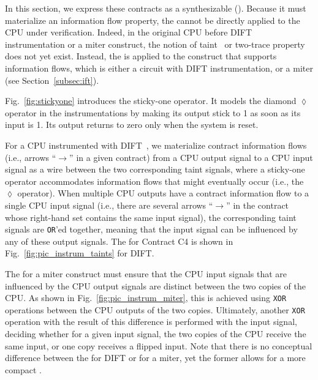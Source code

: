 
In this section, we express these contracts as a synthesizable \pici (\PICI).
Because it must materialize an information flow property, the \PICI cannot be directly applied to the CPU under verification.
Indeed, in the original CPU before DIFT instrumentation or a miter construct, the notion of taint~\cite{solt2022cellift,ceesay2024mucfi} or two-trace property~\cite{wang2023specification,dinesh2024conjunct,dinesh2025h,tan2025contractshadowlogic} does not yet exist.
Instead, the \PICI is applied to the construct that supports information flows, which is either a circuit with DIFT instrumentation, or a miter (see Section~\ref{subsec:ift}).

Fig.~\ref{fig:stickyone} introduces the sticky-one operator.
It models the diamond $\lozenge$ operator in the instrumentations by making its output stick to 1 as soon as its input is 1.
Its output returns to zero only when the system is reset.

For a CPU instrumented with DIFT~\cite{tiwari2009complete,solt2022cellift}, we materialize contract information flows (i.e., arrows ``$\rightarrow$'' in a given contract) from a CPU output signal to a CPU input signal as a wire between the two corresponding taint signals, where a sticky-one operator accommodates information flows that might eventually occur (i.e., the $\lozenge$ operator).
When multiple CPU outputs have a contract information flow to a single CPU input signal (i.e., there are several arrows ``$\rightarrow$'' in the contract whose right-hand set contains the same input signal), the corresponding taint signals are \texttt{OR}'ed together, meaning that the input signal can be influenced by any of these output signals.
The \PICI for Contract C4 is shown in Fig.~\ref{fig:pic_instrum_taints} for DIFT.

The \PICI for a miter construct must ensure that the CPU input signals that are influenced by the CPU output signals are distinct between the two copies of the CPU.
As shown in Fig.~\ref{fig:pic_instrum_miter}, this is achieved using \texttt{XOR} operations between the CPU outputs of the two copies.
Ultimately, another \texttt{XOR} operation with the result of this difference is performed with the input signal, deciding whether for a given input signal, the two copies of the CPU receive the same input, or one copy receives a flipped input.
Note that there is no conceptual difference between the \PICI for DIFT or for a miter, yet the former allows for a more compact \PICI.

